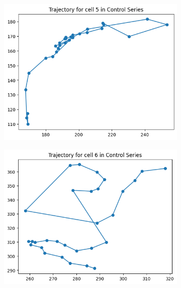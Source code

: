 \documentclass{article}
\begin{document}
\clearpage
\begin{figure}[h!]
    \centering
    \begin{subfigure}[b]{0.5\linewidth}
        \centering
        \includegraphics[width=\linewidth]{Report/Appendix_Images/Trajectory-A-Control/trajectory_5.png}       
    \end{subfigure}%
    \begin{subfigure}[b]{0.5\linewidth}
        \centering
        \includegraphics[width=\linewidth]{Report/Appendix_Images/Trajectory-A-Control/trajectory_6.png}
    \end{subfigure}
    \begin{subfigure}[b]{0.5\linewidth}

\end{subfigure}
\end{figure}
\end{document}
